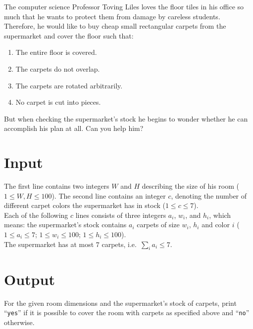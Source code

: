 
The computer science Professor Toving Liles loves the floor tiles in his office
so much that he wants to protect them from damage by careless students.
Therefore, he would like to buy cheap small rectangular carpets from the
supermarket and cover the floor such that:
\begin{enumerate}
\item The entire floor is covered.
\item The carpets do not overlap.
\item The carpets are rotated arbitrarily.
\item No carpet is cut into pieces.
\end{enumerate}
But when checking the supermarket's stock he begins to wonder whether he can
accomplish his plan at all. Can you help him?

\section*{Input}

The first line contains two integers $W$ and $H$
describing the size of his room ($1\le W,H \le 100$). The second line contains an integer $c$,
denoting the number of different carpet colors the supermarket has in
stock ($1 \le c \le 7$).\\
Each of the following $c$ lines consists of three integers $a_i$, $w_i$, and $h_i$,
which means: the supermarket's stock contains $a_i$ carpets of size $w_i$,
$h_i$ and color $i$ ($1\le a_i \le 7$; $1\le w_i\le 100$; $1\le h_i \le 100$).\\
The supermarket has at most $7$ carpets, i.e.~$\sum_{i} a_i \le 7$.

\section*{Output}
For the given room dimensions and the supermarket's stock of carpets, print
``\texttt{yes}'' if it is possible to cover the room with carpets as specified above and
``\texttt{no}'' otherwise.

